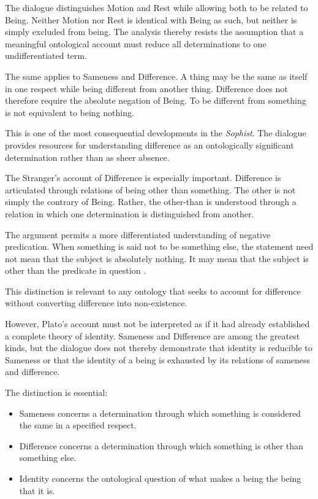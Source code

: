 The dialogue distinguishes Motion and Rest while allowing both to be
related to Being. Neither Motion nor Rest is identical with Being as
such, but neither is simply excluded from being. The analysis thereby
resists the assumption that a meaningful ontological account must
reduce all determinations to one undifferentiated term.

The same applies to Sameness and Difference. A thing may be the same
as itself in one respect while being different from another thing.
Difference does not therefore require the absolute negation of Being.
To be different from something is not equivalent to being nothing.

This is one of the most consequential developments in the
\textit{Sophist}. The dialogue provides resources for understanding
difference as an ontologically significant determination rather than
as sheer absence.

The Stranger's account of Difference is especially important. Difference
is articulated through relations of being other than something. The
other is not simply the contrary of Being. Rather, the other-than is
understood through a relation in which one determination is distinguished
from another.

The argument permits a more differentiated understanding of negative
predication. When something is said not to be something else, the
statement need not mean that the subject is absolutely nothing. It may
mean that the subject is other than the predicate in question
\citep{PlatoSophist}.

This distinction is relevant to any ontology that seeks to account for
difference without converting difference into non-existence.

However, Plato's account must not be interpreted as if it had already
established a complete theory of identity. Sameness and Difference are
among the greatest kinds, but the dialogue does not thereby demonstrate
that identity is reducible to Sameness or that the identity of a being
is exhausted by its relations of sameness and difference.

The distinction is essential:

\begin{itemize}
    \item Sameness concerns a determination through which something is
    considered the same in a specified respect.
    \item Difference concerns a determination through which something
    is other than something else.
    \item Identity concerns the ontological question of what makes a
    being the being that it is.
\end{itemize}


